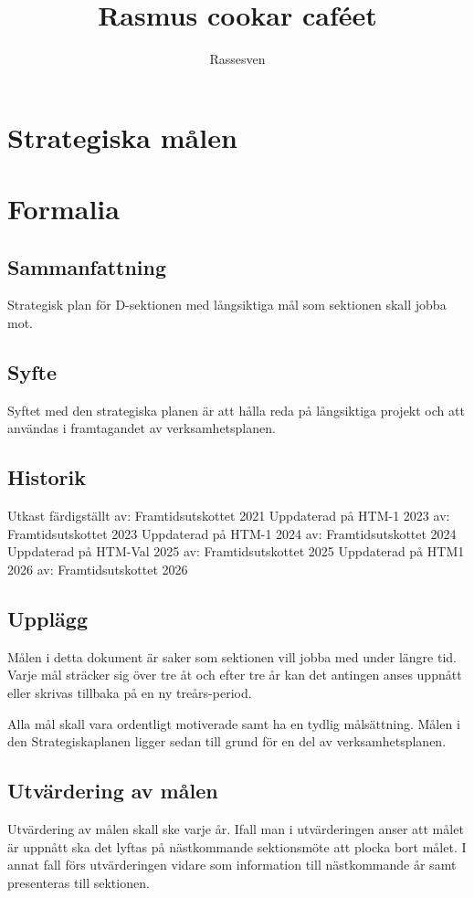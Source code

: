 \documentclass[nopdfbookmarks,a4paper, 11pt, twoside]{article}
\title{Rasmus cookar caféet}
\author{Rassesven}
\begin{document}
\section*{Strategiska målen}

\section{Formalia}
\subsection{Sammanfattning}
Strategisk plan för D-sektionen med långsiktiga mål som sektionen skall jobba mot.

\subsection{Syfte}
Syftet med den strategiska planen är att hålla reda på långsiktiga projekt och att användas i framtagandet av verksamhetsplanen.

\subsection{Historik}
Utkast färdigställt av: Framtidsutskottet 2021
Uppdaterad på HTM-1 2023 av: Framtidsutskottet 2023
Uppdaterad på HTM-1 2024 av: Framtidsutskottet 2024
Uppdaterad på HTM-Val 2025 av: Framtidsutskottet 2025
Uppdaterad på HTM1 2026 av: Framtidsutskottet 2026

\subsection{Upplägg}
Målen i detta dokument är saker som sektionen vill jobba med under längre tid. Varje mål sträcker sig över tre åt och efter tre år kan det antingen anses uppnått eller skrivas tillbaka på en ny treårs-period.

Alla mål skall vara ordentligt motiverade samt ha en tydlig målsättning. Målen i den Strategiskaplanen ligger sedan till grund för en del av verksamhetsplanen.

\subsection{Utvärdering av målen}
Utvärdering av målen skall ske varje år. Ifall man i utvärderingen anser att målet är uppnått ska det lyftas på nästkommande sektionsmöte att plocka bort målet. I annat fall förs utvärderingen vidare som information till nästkommande år samt presenteras till sektionen.
\end{document}
